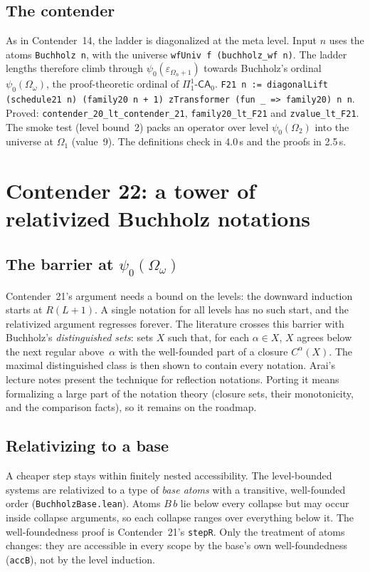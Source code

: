\documentclass[11pt]{article}
\theoremstyle{definition}
\theoremstyle{remark}
\newcommand{\lean}[1]{\texttt{#1}}
\begin{document}
\subsection{The contender}
As in Contender~14, the ladder is diagonalized at the meta level. Input $n$
uses the atoms \lean{Buchholz n}, with the universe
\lean{wfUniv f (buchholz\_wf n)}. The ladder lengths therefore climb through
$\psi_0(\varepsilon_{\Omega_n+1})$ towards Buchholz's ordinal $\psi_0(\Omega_\omega)$,
the proof-theoretic ordinal of $\Pi^1_1$-$\mathsf{CA}_0$.
\lean{F21 n := diagonalLift (schedule21 n) (family20 n + 1) zTransformer (fun \_ => family20) n n}.
Proved: \lean{contender\_20\_lt\_\allowbreak contender\_21}, \lean{family20\_lt\_F21} and
\lean{zvalue\_lt\_F21}. The smoke test (level bound~2) packs an operator over
level $\psi_0(\Omega_2)$ into the universe at $\Omega_1$ (value~9). The
definitions check in 4.0\,s and the proofs in 2.5\,s.

\section{Contender 22: a tower of relativized Buchholz notations}

\subsection{The barrier at \texorpdfstring{$\psi_0(\Omega_\omega)$}{psi0(Omega omega)}}
Contender~21's argument needs a bound on the levels: the downward induction
starts at $R(L+1)$. A single notation for all levels has no such start, and
the relativized argument regresses forever. The literature crosses this barrier
with Buchholz's \emph{distinguished sets}: sets $X$ such that, for each
$\alpha\in X$, $X$ agrees below the next regular above~$\alpha$ with the
well-founded part of a closure $C^\alpha(X)$. The maximal distinguished class is
then shown to contain every notation. Arai's lecture notes present the
technique for reflection notations. Porting it means formalizing a large part of
the notation theory (closure sets, their monotonicity, and the comparison
facts), so it remains on the roadmap.

\subsection{Relativizing to a base}
A cheaper step stays within finitely nested accessibility. The level-bounded
systems are relativized to a type of \emph{base atoms} with a transitive,
well-founded order (\lean{BuchholzBase.lean}). Atoms $B\,b$ lie below every
collapse but may occur inside collapse arguments, so each collapse ranges over
everything below it. The well-foundedness proof is Contender~21's
\lean{stepR}. Only the treatment of atoms changes: they are accessible in every
scope by the base's own well-foundedness (\lean{accB}), not by the level
induction.
\end{document}
